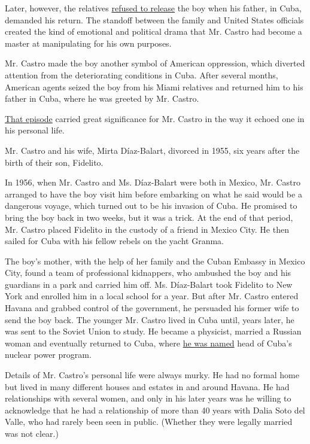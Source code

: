 Later, however, the relatives
\href{http://www.nytimes3xbfgragh.onion/2000/04/14/us/elian-gonzalez-case-overview-cuban-s-family-defies-reno-court-issues-stay.html}{refused
to release} the boy when his father, in Cuba, demanded his return. The
standoff between the family and United States officials created the kind
of emotional and political drama that Mr. Castro had become a master at
manipulating for his own purposes.

Mr. Castro made the boy another symbol of American oppression, which
diverted attention from the deteriorating conditions in Cuba. After
several months, American agents seized the boy from his Miami relatives
and returned him to his father in Cuba, where he was greeted by Mr.
Castro.

\href{http://www.nytimes3xbfgragh.onion/2000/04/27/us/elian-gonzalez-case-counting-cost-castro-emerges-conflict-s-clear-winner.html}{That
episode} carried great significance for Mr. Castro in the way it echoed
one in his personal life.

Mr. Castro and his wife, Mirta Díaz-Balart, divorced in 1955, six years
after the birth of their son, Fidelito.

In 1956, when Mr. Castro and Ms. Díaz-Balart were both in Mexico, Mr.
Castro arranged to have the boy visit him before embarking on what he
said would be a dangerous voyage, which turned out to be his invasion of
Cuba. He promised to bring the boy back in two weeks, but it was a
trick. At the end of that period, Mr. Castro placed Fidelito in the
custody of a friend in Mexico City. He then sailed for Cuba with his
fellow rebels on the yacht Granma.

The boy's mother, with the help of her family and the Cuban Embassy in
Mexico City, found a team of professional kidnappers, who ambushed the
boy and his guardians in a park and carried him off. Ms. Díaz-Balart
took Fidelito to New York and enrolled him in a local school for a year.
But after Mr. Castro entered Havana and grabbed control of the
government, he persuaded his former wife to send the boy back. The
younger Mr. Castro lived in Cuba until, years later, he was sent to the
Soviet Union to study. He became a physicist, married a Russian woman
and eventually returned to Cuba, where
\href{http://www.nytimes3xbfgragh.onion/1981/11/20/nyregion/notes-on-people-a-castro-reappears-after-long-silence.html}{he
was named} head of Cuba's nuclear power program.

Details of Mr. Castro's personal life were always murky. He had no
formal home but lived in many different houses and estates in and around
Havana. He had relationships with several women, and only in his later
years was he willing to acknowledge that he had a relationship of more
than 40 years with Dalia Soto del Valle, who had rarely been seen in
public. (Whether they were legally married was not clear.)

